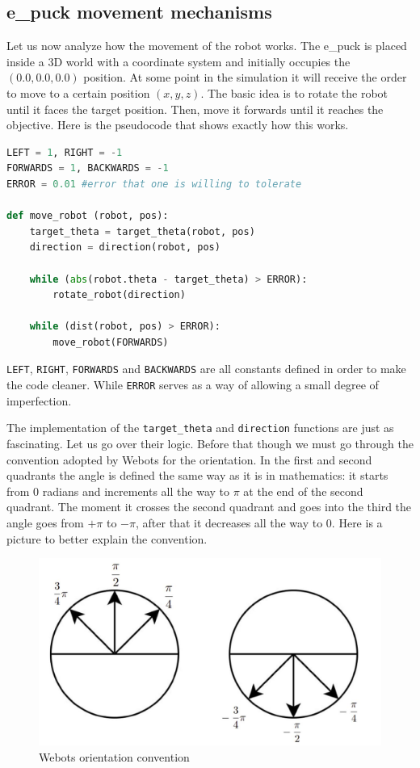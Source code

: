 \subsection{e\_puck movement mechanisms} Let us now analyze how the movement of the robot works. The e\_puck is placed inside a 3D world with a coordinate system and initially occupies the $(0.0,0.0,0.0)$ position. At some point in the simulation it will receive the order to move to a certain position $(x,y,z)$. The basic idea is to rotate the robot until it faces the target position. Then, move it forwards until it reaches the objective. Here is the pseudocode that shows exactly how this works.
\begin{lstlisting}[language=Python, caption=e\_puck robot movement algorithm]
LEFT = 1, RIGHT = -1
FORWARDS = 1, BACKWARDS = -1
ERROR = 0.01 #error that one is willing to tolerate

def move_robot (robot, pos):
    target_theta = target_theta(robot, pos)
    direction = direction(robot, pos)

    while (abs(robot.theta - target_theta) > ERROR):
        rotate_robot(direction)
    
    while (dist(robot, pos) > ERROR):
        move_robot(FORWARDS)
\end{lstlisting}
\texttt{LEFT}, \texttt{RIGHT}, \texttt{FORWARDS} and \texttt{BACKWARDS} are all constants defined in order to make the code cleaner. While \texttt{ERROR} serves as a way of allowing a small degree of imperfection. 
\par
The implementation of the \texttt{target\_theta} and \texttt{direction} functions are just as fascinating. Let us go over their logic. Before that though we must go through the convention adopted by Webots for the orientation. In the first and second quadrants the angle is defined the same way as it is in mathematics: it starts from $0$ radians and increments all the way to $\pi$ at the end of the second quadrant. The moment it crosses the second quadrant and goes into the third the angle goes from $+\pi$ to $-\pi$, after that it decreases all the way to $0$. Here is a picture to better explain the convention.
\begin{figure}[H]
\centering
\includegraphics[scale=0.2]{images/webots_angles.jpg}
\caption{Webots orientation convention}
\end{figure}

